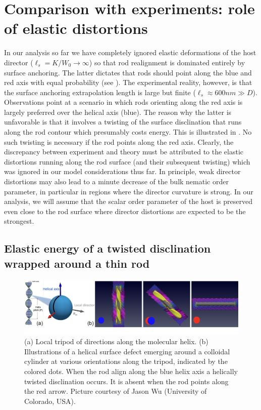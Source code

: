 \section[Role of elastic distortions]{Comparison with experiments: role of elastic distortions}

In our analysis so far we have completely ignored elastic deformations of the host director ($\ell_{s} = K/W_{0} \rightarrow \infty$) so that rod realignment is dominated entirely by surface anchoring. The latter dictates that rods should point along the blue and red axis with equal probability (see ). The experimental reality, however, is that the surface anchoring extrapolation length is large but finite ($\ell_{s} \approx 600 nm \gg D$). Observations point at a scenario in which  rods  orienting along the red axis is largely preferred over the helical axis (blue). The reason why the latter is unfavorable  is that it involves a twisting of the surface disclination that runs along the rod contour which presumably costs energy. This is illustrated in . No such twisting is necessary if the rod points along the red axis.   Clearly, the discrepancy between experiment and theory must be attributed to the  elastic distortions running along the rod surface (and their subsequent twisting) which was ignored in our model considerations thus far. In principle, weak director distortions may also lead to a minute decrease  of the bulk nematic order parameter,  in particular in regions where the director curvature is strong.  In our analysis, we will assume that the scalar order parameter of the host is preserved even close to the rod surface where director distortions are expected to be the strongest.



\subsection{Elastic energy of a twisted disclination wrapped around a thin rod}




\begin{figure}
	\includegraphics[width = \columnwidth]{figures/chapter-3/twisted_disclination}
	\caption[Illustrations of a helical surface defect emerging around a colloidal cylinder at various orientations]{ (a) Local tripod of directions along the molecular helix. (b) Illustrations of a helical surface defect emerging around a colloidal cylinder at various orientations along the tripod, indicated by the colored dots. When the rod align along the blue helix axis a helically twisted disclination occurs. It is absent when the rod points along the red arrow. Picture courtesy of Jason Wu (University of Colorado, USA). }
	\label{twisdis}
\end{figure}




